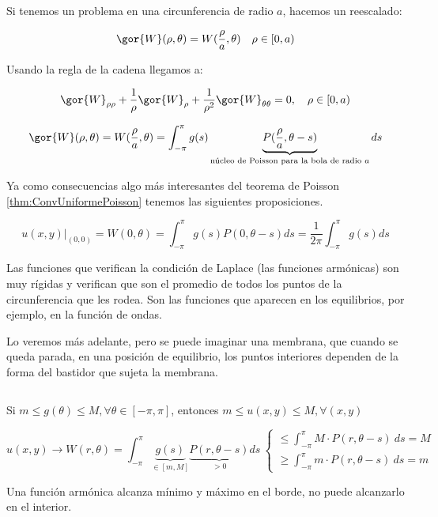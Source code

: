 
		Si tenemos un problema en una circunferencia de radio $a$, hacemos un reescalado:

		\[ \gor{W}(\rho, \theta) = W(\frac{\rho}{a},\theta) \quad \rho \in [0,a) \]

		Usando la regla de la cadena llegamos a:

		\[\gor{W}_{\rho \rho} + \frac{1}{\rho} \gor{W}_\rho + \frac{1}{\rho^2} \gor{W}_{\theta \theta} = 0, \quad \rho \in [0,a)  \]

		\[\gor{W}(\rho, \theta) = W(\frac{\rho}{a},\theta) = \int^{\pi}_{-\pi} g(s)\underbrace{P(\frac{\rho}{a},\theta-s)}_{\text{núcleo de Poisson para la bola de radio }a} ds \]

		Ya como consecuencias algo más interesantes del teorema de Poisson \ref{thm:ConvUniformePoisson} tenemos las siguientes proposiciones.

		\begin{prop}

		 \[u(x,y)|_{(0,0)}  = W(0,\theta) = \int_{-\pi}^\pi g(s) P(0, \theta - s) ds = \frac{1}{2\pi} \int_{-\pi}^\pi g(s) ds \]
		\end{prop}
		\newpage %

		Las funciones que verifican la condición de Laplace (las funciones armónicas) son muy rígidas y verifican que son el promedio de todos los puntos de la circunferencia que les rodea. Son las funciones que aparecen en los equilibrios, por ejemplo, en la función de ondas.

		Lo veremos más adelante, pero se puede imaginar una membrana, que cuando se queda parada, en una posición de equilibrio, los puntos interiores dependen de la forma del bastidor que sujeta la membrana.

		\begin{prop}
		$ $ %

		Si $m \leq g(\theta) \leq M, \forall \theta \in [-\pi,\pi]$, entonces $m \leq u(x,y) \leq M, \forall (x,y)$

		\[u(x,y) \rightarrow W(r,\theta) = \int_{-\pi}^{\pi} \underbrace{g(s)}_{\in [m,M]} \underbrace{P(r,\theta-s)}_{> 0} ds \ \begin{cases}
			\leq {\displaystyle \int_{-\pi}^{\pi}} M \cdot P(r,\theta-s)\  ds = M \\
			\geq {\displaystyle \int_{-\pi}^{\pi}} m \cdot P(r,\theta-s)\  ds = m

		\end{cases} \]

		\noindent Una función armónica alcanza mínimo y máximo en el borde, no puede alcanzarlo en el interior.
		\end{prop}

